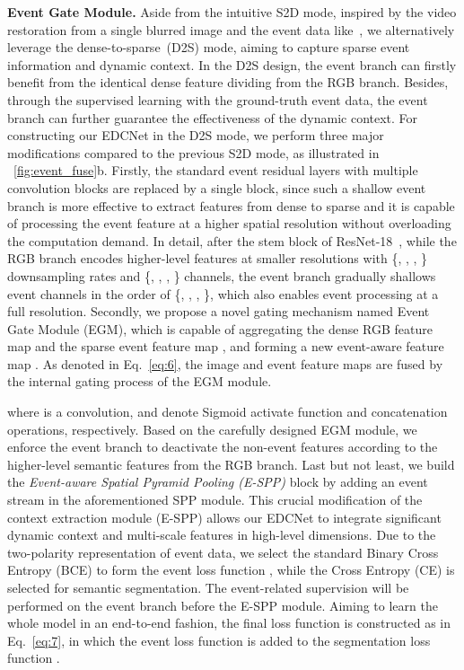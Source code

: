 \documentclass[journal]{IEEEtran}
\begin{document}
\textbf{Event Gate Module.}
Aside from the intuitive S2D mode, inspired by the video restoration from a single blurred image and the event data like~\cite{pan2019video_from_event}\cite{jin2018video_from_blurred_image}, we alternatively leverage the dense-to-sparse~(D2S) mode, aiming to capture sparse event information and dynamic context. In the D2S design, the event branch can firstly benefit from the identical dense feature dividing from the RGB branch. Besides, through the supervised learning with the ground-truth event data, the event branch can further guarantee the effectiveness of the dynamic context. For constructing our EDCNet in the D2S mode, we perform three major modifications compared to the previous S2D mode, as illustrated in ~\cref{fig:event_fuse}b. Firstly, the standard event residual layers with multiple convolution blocks are replaced by a single block, since such a shallow event branch is more effective to extract features from dense to sparse and it is capable of processing the event feature at a higher spatial resolution without overloading the computation demand. In detail, after the  stem block of ResNet-18~\cite{he2016resnet}, while the RGB branch encodes higher-level features at smaller resolutions with \{, , , \} downsampling rates and \{, , , \} channels, the event branch gradually shallows event channels in the order of \{, , , \}, which also enables event processing at a full resolution. Secondly, we propose a novel gating mechanism named Event Gate Module (EGM), which is capable of aggregating the dense RGB feature map  and the sparse event feature map , and forming a new event-aware feature map . As denoted in Eq.~\eqref{eq:6}, the image and event feature maps are fused by the internal gating process of the EGM module.

{where  is a  convolution,  and  denote Sigmoid activate function and concatenation operations, respectively.} Based on the carefully designed EGM module, we enforce the event branch to deactivate the non-event features according to the higher-level semantic features from the RGB branch. Last but not least, we build the \emph{Event-aware Spatial Pyramid Pooling (E-SPP)} block by adding an event stream in the aforementioned SPP module. This crucial modification of the context extraction module (E-SPP) allows our EDCNet to integrate significant dynamic context and multi-scale features in high-level dimensions. Due to the two-polarity representation of event data, we select the standard Binary Cross Entropy (BCE) to form the event loss function , while the Cross Entropy (CE) is selected for semantic segmentation. The event-related supervision will be performed on the event branch before the E-SPP module. Aiming to learn the whole model in an end-to-end fashion, the final loss function is constructed as in Eq.~\eqref{eq:7}, in which the event loss function  is added to the segmentation loss function .
\end{document}
